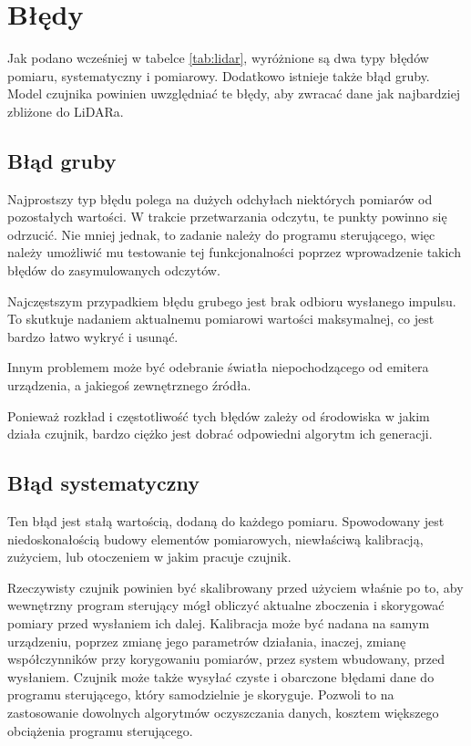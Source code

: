 \section{Błędy}
Jak podano wcześniej w tabelce \ref{tab:lidar}, wyróżnione są dwa typy błędów pomiaru, systematyczny i pomiarowy.
Dodatkowo istnieje także błąd gruby.
Model czujnika powinien uwzględniać te błędy, aby zwracać dane jak najbardziej zbliżone do LiDARa.

\subsection{Błąd gruby}
Najprostszy typ błędu polega na dużych odchyłach niektórych pomiarów od pozostałych wartości.
W trakcie przetwarzania odczytu, te punkty powinno się odrzucić.
Nie mniej jednak, to zadanie należy do programu sterującego, więc należy umożliwić mu testowanie tej funkcjonalności poprzez wprowadzenie takich błędów do zasymulowanych odczytów.

Najczęstszym przypadkiem błędu grubego jest brak odbioru wysłanego impulsu. 
To skutkuje nadaniem aktualnemu pomiarowi wartości maksymalnej, co jest bardzo łatwo wykryć i usunąć.

Innym problemem może być odebranie światła niepochodzącego od emitera urządzenia, a jakiegoś zewnętrznego źródła.

Ponieważ rozkład i częstotliwość tych błędów zależy od środowiska w jakim działa czujnik, bardzo ciężko jest dobrać odpowiedni algorytm ich generacji.

\subsection{Błąd systematyczny}
Ten błąd jest stałą wartością, dodaną do każdego pomiaru.
Spowodowany jest niedoskonałością budowy elementów pomiarowych, niewłaściwą kalibracją, zużyciem, lub otoczeniem w jakim pracuje czujnik.

Rzeczywisty czujnik powinien być skalibrowany przed użyciem właśnie po to, aby wewnętrzny program sterujący mógł obliczyć aktualne zboczenia 
i skorygować pomiary przed wysłaniem ich dalej. Kalibracja może być nadana na samym urządzeniu, poprzez zmianę jego parametrów działania,
inaczej, zmianę współczynników przy korygowaniu pomiarów, przez system wbudowany, przed wysłaniem.
Czujnik może także wysyłać czyste i obarczone błędami dane do programu sterującego, który samodzielnie je skoryguje.
Pozwoli to na zastosowanie dowolnych algorytmów oczyszczania danych, kosztem większego obciążenia programu sterującego.

